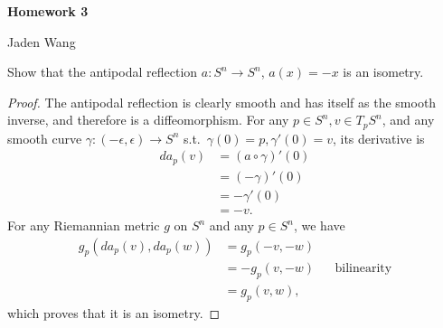 \documentclass[12pt]{article}
\begin{document}
\centerline {\textsf{\textbf{\LARGE{Homework 3}}}}
\centerline {Jaden Wang}
\vspace{.15in}

\begin{problem}[LN12 0.1.1]
Show that the antipodal reflection $ a: S^{n} \to S^{n}$, $ a(x) = -x$ is an isometry. 
\end{problem}
\begin{proof}
The antipodal reflection is clearly smooth and has itself as the smooth inverse, and therefore is a diffeomorphism. For any $ p \in S^{n}, v \in T_pS^{n}$, and any smooth curve $ \gamma: (- \epsilon, \epsilon) \to S^{n}$ s.t.\ $ \gamma(0) =p, \gamma'(0) = v$, its derivative is
\begin{align*}
	da_p(v) &= \left( a \circ \gamma \right) '(0)\\
	&= (-\gamma)'(0) \\
	&= - \gamma'(0) \\
	&= - v .
\end{align*}
For any Riemannian metric $ g$ on  $ S^{n}$ and any $ p \in S^{n}$, we have
\begin{align*}
	g_p(da_p(v),da_p(w)) &= g_p(-v,-w) \\
			     &= -g_p(v,-w) && \text{bilinearity}  \\
	&= g_p(v,w) ,
\end{align*}
which proves that it is an isometry.
\end{proof}
\end{document}
